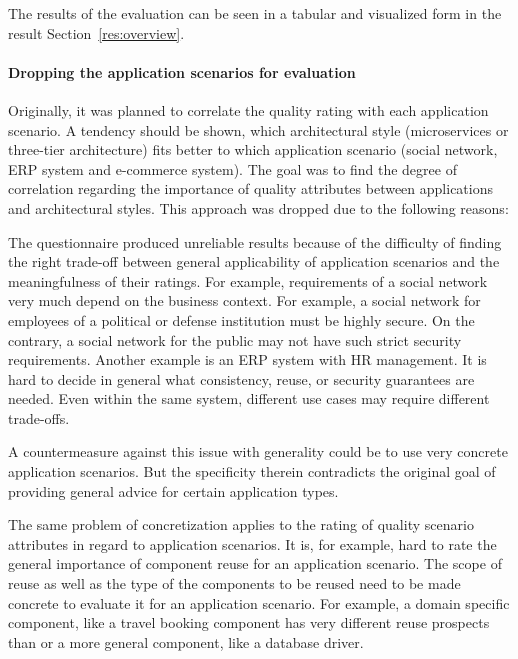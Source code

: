 The results of the evaluation can be seen in a tabular and visualized form in the result Section~\ref{res:overview}.

\paragraph{Dropping the application scenarios for evaluation}
\label{que:dropApplicationScen}
Originally, it was planned to correlate the quality rating with each application scenario.
A tendency should be shown, which architectural style (microservices or three-tier architecture) fits better to which application scenario (social network, ERP system and e-commerce system).
The goal was to find the degree of correlation regarding the importance of quality attributes between applications and architectural styles.
This approach was dropped due to the following reasons:

The questionnaire produced unreliable results because of the difficulty of finding the right trade-off between general applicability of application scenarios and the meaningfulness of their ratings.
For example, requirements of a social network very much depend on the business context.
For example, a social network for employees of a political or defense institution must be highly secure.
On the contrary, a social network for the public may not have such strict security requirements. 
Another example is an ERP system with HR management. 
It is hard to decide in general what consistency, reuse, or security guarantees are needed.
Even within the same system, different use cases may require different trade-offs.

A countermeasure against this issue with generality could be to use very concrete application scenarios. 
But the specificity therein contradicts the original goal of providing general advice for certain application types.

The same problem of concretization applies to the rating of quality scenario attributes in regard to application scenarios.
It is, for example, hard to rate the general importance of component reuse for an application scenario.
The scope of reuse as well as the type of the components to be reused need to be made concrete to evaluate it for an application scenario.
For example, a domain specific component, like a travel booking component has very different reuse prospects than or a more general component, like a database driver.

